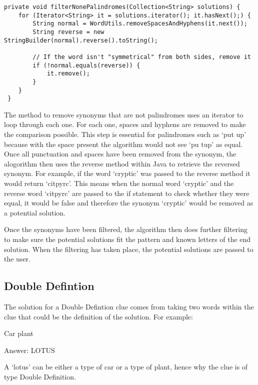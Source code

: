 \begin{lstlisting}[caption={Checking to see if a word is a palindrome},
                   label=palindromeSnippet] 
 private void filterNonePalindromes(Collection<String> solutions) {
	for (Iterator<String> it = solutions.iterator(); it.hasNext();) {
		String normal = WordUtils.removeSpacesAndHyphens(it.next());
		String reverse = new StringBuilder(normal).reverse().toString();

		// If the word isn't "symmetrical" from both sides, remove it
		if (!normal.equals(reverse)) {
			it.remove();
		}
	}
 }
\end{lstlisting}

The method to remove synonyms that are not palindromes uses an 
iterator to loop through each one. For each one, spaces and hyphens 
are removed to make the comparison possible. This step is essential for 
palindromes such as `put up' because with the space present the 
algorithm would not see `pu tup' as equal. Once all punctuation and
spaces have been removed from the synonym, the alogorithm then 
uses the reverse method within Java to retrieve the reversed synonym. 
For example, if the word `cryptic' was passed to the reverse method 
it would return `citpyrc'. This means when the normal word `cryptic' 
and the reverse word `citpyrc' are passed to the if statement to check 
whether they were equal, it would be false and therefore the synonym 
`cryptic' would be removed as a potential solution.

Once the synonyms have been filtered, the algorithm then does further 
filtering to make sure the potential solutions fit the pattern and known 
letters of the end solution. When the filtering has taken place, the 
potential solutions are passed to the user.

\subsection{Double Defintion}

The solution for a Double Defintion clue comes from taking two 
words within the clue that could be the definition of the solution. 
For example:

Car plant

Answer: LOTUS

A `lotus' can be either a type of car or a type of plant, hence 
why the clue is of type Double Definition. 

